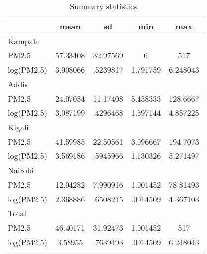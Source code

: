 \begin{table}[htbp]\centering
\def\sym#1{\ifmmode^{#1}\else\(^{#1}\)\fi}
\caption{Summary statistics\label{tab:sumStats}}
\begin{tabular}{l*{1}{cccc}}
\hline\hline
                    &        mean&          sd&         min&         max\\
\hline
Kampala             &            &            &            &            \\
PM2.5               &    57.33408&    32.97569&           6&         517\\
log(PM2.5)          &    3.908066&    .5239817&    1.791759&    6.248043\\
\hline
Addis               &            &            &            &            \\
PM2.5               &    24.07054&    11.17408&    5.458333&    128.6667\\
log(PM2.5)          &    3.087199&    .4296468&    1.697144&    4.857225\\
\hline
Kigali              &            &            &            &            \\
PM2.5               &    41.59985&    22.50561&    3.096667&    194.7073\\
log(PM2.5)          &    3.569186&    .5945966&    1.130326&    5.271497\\
\hline
Nairobi             &            &            &            &            \\
PM2.5               &    12.94282&    7.990916&    1.001452&    78.81493\\
log(PM2.5)          &    2.368886&    .6508215&    .0014509&    4.367103\\
\hline
Total               &            &            &            &            \\
PM2.5               &    46.40171&    31.92473&    1.001452&         517\\
log(PM2.5)          &     3.58955&    .7639493&    .0014509&    6.248043\\
\hline\hline
\end{tabular}
\end{table}
